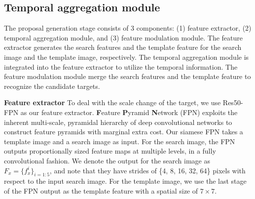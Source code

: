 \documentclass{article}
\begin{document}
\subsection{Temporal aggregation module}
\label{sec:stage1}
The proposal generation stage consists of 3 components: (1) feature extractor, (2) temporal aggregation module, and (3) feature modulation module.
The feature extractor generates the search features and the template feature for the search image and the template image, respectively. The temporal aggregation module is integrated into the feature extractor to utilize the temporal information. The feature modulation module merge the search features and the template feature to recognize the candidate targets.

\textbf{Feature extractor} To deal with the scale change of the target, we use Res50-FPN \cite{lin2017feature} as our feature extractor.
\textbf{F}eature \textbf{P}yramid \textbf{N}etwork (FPN) exploits the inherent multi-scale,  pyramidal hierarchy of deep convolutional networks to construct feature pyramids with marginal extra cost. 
Our siamese FPN takes a template image and a search image as input. For the search image, the FPN outputs proportionally sized feature maps at multiple levels, in a fully convolutional fashion.
We denote the output for the search image as $F_{x} = \{f_{x}^i\}_{i=1:5}$, and note that they have strides of \{4, 8, 16, 32, 64\} pixels with respect to the input search image.
For the template image, we use the last stage of the FPN output as the template feature with a spatial size of $7 \times 7$.
\end{document}
